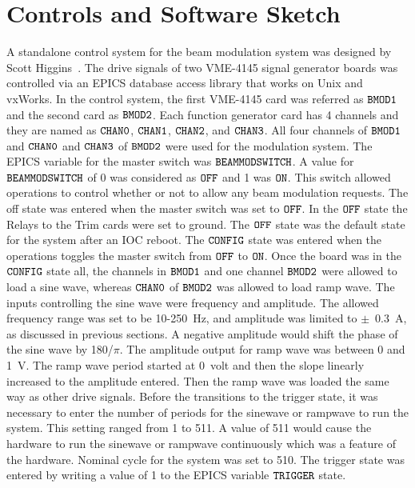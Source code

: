 \section{Controls and Software Sketch}
\label{Controls and Software Sketch}
A standalone control system for the beam modulation system was designed by Scott Higgins~\cite{nur_bm_controls, higgins_communication, nur_bm_GUI_proposal}. 
The drive signals of two VME-4145 signal generator boards was controlled via an EPICS database access library that works on Unix and vxWorks. 
In the control system, the first VME-4145 card was referred as ${\tt BMOD1}$ and the second card as ${\tt BMOD2}$. Each function generator card has 4 channels and they are named as ${\tt CHAN0}$, ${\tt CHAN1}$, ${\tt CHAN2}$, and ${\tt CHAN3}$. All four channels of ${\tt BMOD1}$ and ${\tt CHAN0}$ and ${\tt CHAN3}$ of ${\tt BMOD2}$ were used for the modulation system. 
The EPICS variable for the master switch was ${\tt BEAMMODSWITCH}$. A value for ${\tt BEAMMODSWITCH}$ of 0 was considered as ${\tt OFF}$ and 1 was ${\tt ON}$.  This switch allowed operations to control whether or not to allow any beam modulation requests. The off state was entered when the master switch was set to ${\tt OFF}$. In the ${\tt OFF}$ state the Relays to the Trim cards were set to ground. The ${\tt OFF}$ state was the default state for the system after an IOC reboot. The ${\tt CONFIG}$ state was entered when the operations toggles the master switch from ${\tt OFF}$ to ${\tt ON}$. Once the board was in the ${\tt CONFIG}$ state all, the channels in ${\tt BMOD1}$ and one channel ${\tt BMOD2}$ were allowed to load a sine wave, whereas ${\tt CHAN0}$ of ${\tt BMOD2}$ was allowed to load ramp wave. The inputs controlling the sine wave were frequency and amplitude. The allowed frequency range was set to be 10-250~Hz, and amplitude was limited to $\pm$~0.3~A, as discussed in previous sections. A negative amplitude would shift the phase of the sine wave by 180\degrees{}/$\pi$. The amplitude output for ramp wave was between 0 and 1~V. The ramp wave period started at 0~volt and then the slope linearly increased to the amplitude entered. Then the ramp wave was loaded the same way as other drive signals. Before the transitions to the trigger state, it was necessary to enter the number of periods for the sinewave or rampwave to run the system. This setting ranged from 1 to 511. A value of 511 would cause the hardware to run the sinewave or rampwave continuously which was a feature of the hardware. Nominal cycle for the system was set to 510. The trigger state was entered by writing a value of 1 to the EPICS variable ${\tt TRIGGER}$ state.

